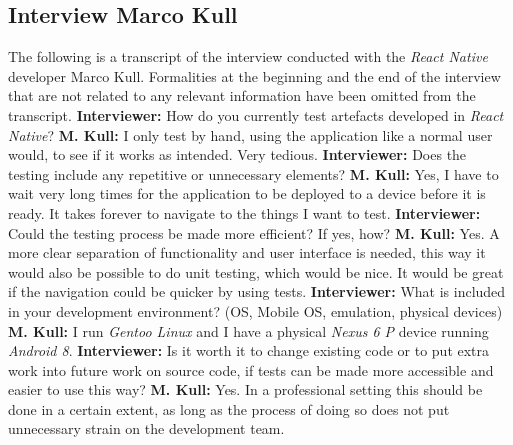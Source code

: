 \begin{appendices}
\newpage

\section{Interview Marco Kull}
\label{appendix:interview_marco_kull}

The following is a transcript of the interview conducted with the \textit{React Native} developer Marco Kull. Formalities at the beginning and the end of the interview that are not related to any relevant information have been omitted from the transcript.
\newline
\newline
\textbf{Interviewer:} How do you currently test artefacts developed in \textit{React Native}?
\newline
\newline
\textbf{M. Kull:} I only test by hand, using the application like a normal user would, to see if it works as intended. Very tedious.
\newline
\newline
\textbf{Interviewer:} Does the testing include any repetitive or unnecessary elements?
\newline
\newline
\textbf{M. Kull:} Yes, I have to wait very long times for the application to be deployed to a device before it is ready. It takes forever to navigate to the things I want to test.
\newline
\newline
\textbf{Interviewer:} Could the testing process be made more efficient? If yes, how?
\newline
\newline
\textbf{M. Kull:} Yes. A more clear separation of functionality and user interface is needed, this way it would also be possible to do unit testing, which would be nice. It would be great if the navigation could be quicker by using tests.  
\newline
\newline
\textbf{Interviewer:} What is included in your development environment? (OS, Mobile OS, emulation, physical devices)
\newline
\newline
\textbf{M. Kull:} I run \textit{Gentoo Linux} and I have a physical \textit{Nexus 6 P} device running \textit{Android 8}. 
\newline
\newline
\textbf{Interviewer:} Is it worth it to change existing code or to put extra work into future work on source code, if tests can be made more accessible and easier to use this way?
\newline
\newline
\textbf{M. Kull:} Yes. In a professional setting this should be done in a certain extent, as long as the process of doing so does not put unnecessary strain on the development team.


\end{appendices}
